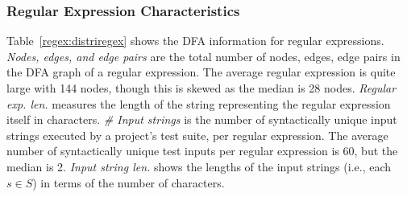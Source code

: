 \subsubsection{Regular Expression Characteristics}
Table~\ref{regex:distriregex} shows the DFA information for regular expressions. \emph{Nodes, edges, and edge pairs} are the total number of nodes, edges, edge pairs in the DFA graph of a regular expression. The average regular expression is quite large with 144 nodes, though this is skewed as the median is 28 nodes. 
\emph{Regular exp. len.} measures the length of the string representing the regular expression itself in characters. 
\emph{\# Input strings} is the number of syntactically unique input strings executed by a project's test suite, per regular expression. 
The average number of syntactically unique test inputs per regular expression is 60, but the median is 2. %
 \emph{Input string len.} shows the lengths of the input strings (i.e., each $s \in S$) in terms of the number of characters. %





